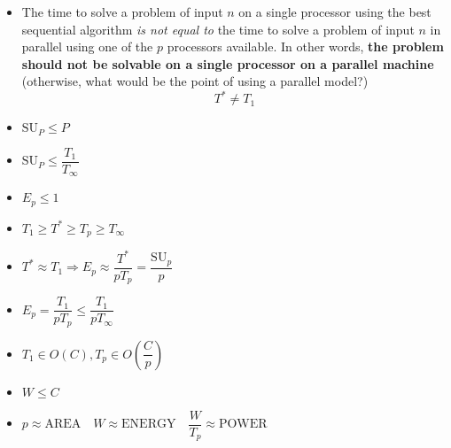 \begin{itemize}
    \item The time to solve a problem of input $n$ on a single processor using the best sequential algorithm \emph{is not equal to} the time to solve a problem of input $n$ in parallel using one of the $p$ processors available. In other words, \textbf{the problem should not be solvable on a single processor on a parallel machine} (otherwise, what would be the point of using a parallel model?)
    \begin{equation*}
        T^{*} \ne T_{1}
    \end{equation*}

    \item $\mathrm{SU}_{P} \le P$

    \item $\mathrm{SU}_{P} \le \dfrac{T_{1}}{T_{\infty}}$

    \item $E_{p} \le 1$

    \item $T_{1} \ge T^{*} \ge T_{p} \ge T_{\infty}$

    \item $T^{*} \approx T_{1} \Rightarrow E_{p} \approx \dfrac{T^{*}}{pT_{p}} = \dfrac{\mathrm{SU}_{p}}{p}$

    \item $E_{p} = \dfrac{T_{1}}{pT_{p}} \le \dfrac{T_{1}}{pT_{\infty}}$

    \item $T_{1} \in O\left(C\right),  T_{p} \in O\left(\dfrac{C}{p}\right)$

    \item $W \le C$

    \item $p \approx \text{AREA} \hspace{1em} W \approx \text{ENERGY} \hspace{1em} \dfrac{W}{T_{p}} \approx \text{POWER}$
\end{itemize}